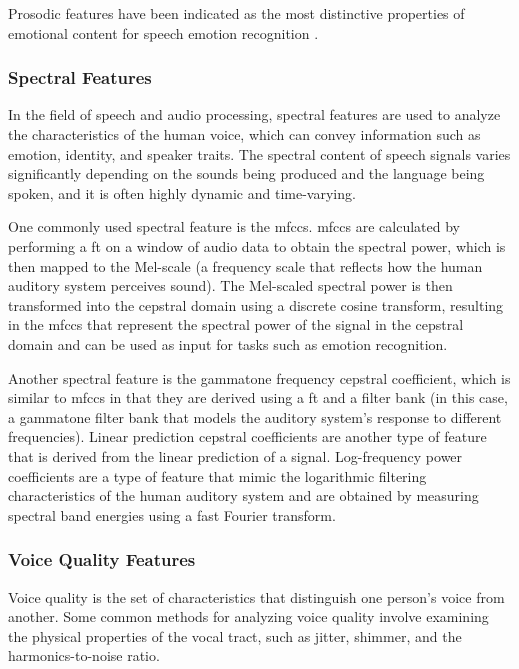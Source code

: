 Prosodic features have been indicated as the most distinctive properties of emotional content for speech emotion recognition \cite{ZhihongZeng2009}.

\subsubsection{Spectral Features}

In the field of speech and audio processing, spectral features are used to analyze the characteristics of the human voice, which can convey information such as emotion, identity, and speaker traits.  The spectral content of speech signals varies significantly depending on the sounds being produced and the language being spoken, and it is often highly dynamic and time-varying.

One commonly used spectral feature is the \ac{mfccs}. \ac{mfccs} are calculated by performing a \ac{ft} on a window of audio data to obtain the spectral power, which is then mapped to the Mel-scale (a frequency scale that reflects how the human auditory system perceives sound). The Mel-scaled spectral power is then transformed into the cepstral domain using a discrete cosine transform, resulting in the \ac{mfccs} that represent the spectral power of the signal in the cepstral domain and can be used as input for tasks such as emotion recognition.

Another spectral feature is the gammatone frequency cepstral coefficient, which is similar to \ac{mfccs} in that they are derived using a \ac{ft} and a filter bank (in this case, a gammatone filter bank that models the auditory system's response to different frequencies). Linear prediction cepstral coefficients are another type of feature that is derived from the linear prediction of a signal. Log-frequency power coefficients are a type of feature that mimic the logarithmic filtering characteristics of the human auditory system and are obtained by measuring spectral band energies using a fast Fourier transform. 


\subsubsection{Voice Quality Features}

Voice quality is the set of characteristics that distinguish one person's voice from another. Some common methods for analyzing voice quality involve examining the physical properties of the vocal tract, such as jitter, shimmer, and the harmonics-to-noise ratio.

